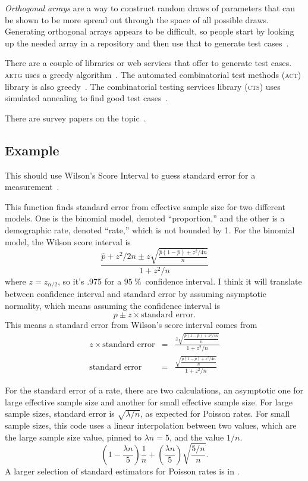 \documentclass[fleqn,10pt]{olplainarticle}
\begin{document}
\emph{Orthogonal arrays} are a way to construct random draws
of parameters that can be shown to be more spread out through
the space of all possible draws. Generating orthogonal arrays
appears to be difficult, so people start by looking up the
needed array in a repository and then use that to generate
test cases~\citep{Owen1992}.

There are a couple of libraries or web services that offer
to generate test cases. \textsc{aetg} uses a greedy algorithm~\citep{cohen1997aetg}.
The automated combinatorial test methods (\textsc{act}) library
is also greedy~\citep{kuhn2008automated}.
The combinatorial testing services library (\textsc{cts})
uses simulated annealing to find good test cases~\citep{hartman2004problems}.

There are survey papers on the topic~\citep{nie2011survey,khalsa2014orchestrated}.


\subsection{Example}
This should use Wilson's Score Interval to guess standard error for a measurement~\citep{agresti1998approximate}.

This function finds standard error from effective sample size for two
different models. One is the binomial model, denoted ``proportion,''
and the other is a demographic rate, denoted ``rate,'' which is not bounded
by 1. For the binomial model, the Wilson score interval is
\begin{equation}
    \frac{\hat{p}+z^2/2n\pm z\sqrt{\frac{\hat{p}(1-\hat{p})+z^2/4n}{n}}}{1+z^2/n}
\end{equation}
where $z=z_{\alpha/2}$, so it's .975 for a $95\:\%$~confidence interval.
I think it will translate between confidence interval and standard
error by assuming asymptotic normality, which means assuming the
confidence interval is
\begin{equation}
    p\pm z \times\mbox{standard error}.
\end{equation}
This means a standard error from Wilson's score interval comes from
\begin{eqnarray}
    z \times\mbox{standard error} & = & \frac{z\sqrt{\frac{\hat{p}(1-\hat{p})+z^2/4n}{n}}}{1+z^2/n} \\
    \mbox{standard error} & = & \frac{\sqrt{\frac{\hat{p}(1-\hat{p})+z^2/4n}{n}}}{1+z^2/n}
\end{eqnarray}

For the standard error of a rate, there are two calculations, an asymptotic one
for large effective sample size and another for small effective sample size.
For large sample sizes, standard error is $\sqrt{\lambda/n}$, as expected for Poisson
rates. For small sample sizes, this code uses a linear interpolation between two values,
which are the large sample size value, pinned to $\lambda n=5$, and the value $1/n$.
\begin{equation}
    \left(1-\frac{\lambda n}{5}\right) \frac{1}{n} + \left(\frac{\lambda n}{5}\right)\sqrt{\frac{5/n}{n}}.
\end{equation}
A larger selection of standard estimators for Poisson rates is in \citet{patil2012}.
\end{document}
